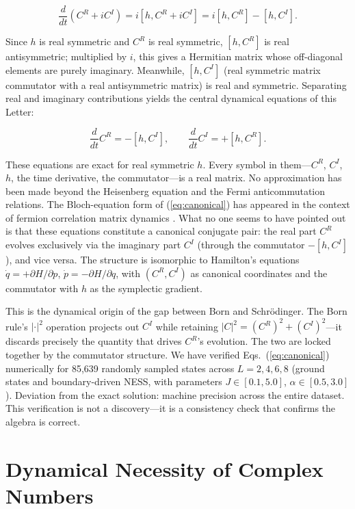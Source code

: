 \documentclass[aps,prd,reprint,superscriptaddress,twocolumn]{revtex4-2}
\begin{document}
\begin{equation}
\frac{d}{dt}(C^R + iC^I) = i[h, C^R + iC^I] = i[h, C^R] - [h, C^I].
\end{equation}

Since $h$ is real symmetric and $C^R$ is real symmetric, $[h, C^R]$ is real antisymmetric; multiplied by $i$, this gives a Hermitian matrix whose off-diagonal elements are purely imaginary. Meanwhile, $[h, C^I]$ (real symmetric matrix commutator with a real antisymmetric matrix) is real and symmetric. Separating real and imaginary contributions yields the central dynamical equations of this Letter:

\begin{equation}
\boxed{\frac{d}{dt}C^R = -[h, C^I]}, \qquad \boxed{\frac{d}{dt}C^I = +[h, C^R]}.
\label{eq:canonical}
\end{equation}

These equations are exact for real symmetric $h$. Every symbol in them---$C^R$, $C^I$, $h$, the time derivative, the commutator---is a real matrix. No approximation has been made beyond the Heisenberg equation and the Fermi anticommutation relations. The Bloch-equation form of (\ref{eq:canonical}) has appeared in the context of fermion correlation matrix dynamics \cite{PeschelEisler2009,BreuerPetruccione2002}. What no one seems to have pointed out is that these equations constitute a canonical conjugate pair: the real part $C^R$ evolves exclusively via the imaginary part $C^I$ (through the commutator $-[h, C^I]$), and vice versa. The structure is isomorphic to Hamilton's equations $\dot{q} = +\partial H/\partial p$, $\dot{p} = -\partial H/\partial q$, with $(C^R, C^I)$ as canonical coordinates and the commutator with $h$ as the symplectic gradient.

This is the dynamical origin of the gap between Born and Schr\"{o}dinger. The Born rule's $|\cdot|^2$ operation projects out $C^I$ while retaining $|C|^2 = (C^R)^2 + (C^I)^2$---it discards precisely the quantity that drives $C^R$'s evolution. The two are locked together by the commutator structure. We have verified Eqs.~(\ref{eq:canonical}) numerically for 85,639 randomly sampled states across $L=2,4,6,8$ (ground states and boundary-driven NESS, with parameters $J\in[0.1,5.0]$, $\alpha\in[0.5,3.0]$). Deviation from the exact solution: machine precision across the entire dataset. This verification is not a discovery---it is a consistency check that confirms the algebra is correct.

\section{Dynamical Necessity of Complex Numbers}
\end{document}

